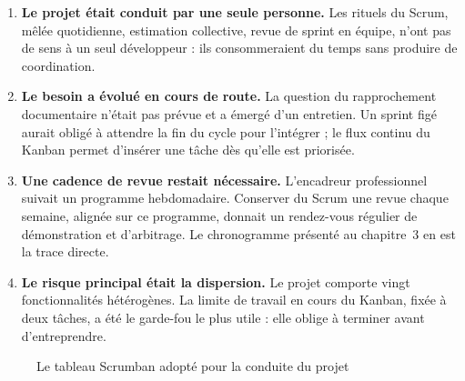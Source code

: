 \begin{enumerate}
  \item \textbf{Le projet était conduit par une seule personne.} Les rituels du
        Scrum, mêlée quotidienne, estimation collective, revue de sprint en
        équipe, n'ont pas de sens à un seul développeur : ils consommeraient du
        temps sans produire de coordination.

  \item \textbf{Le besoin a évolué en cours de route.} La question du
        rapprochement documentaire n'était pas prévue et a émergé d'un
        entretien. Un sprint figé aurait obligé à attendre la fin du cycle pour
        l'intégrer ; le flux continu du Kanban permet d'insérer une tâche dès
        qu'elle est priorisée.

  \item \textbf{Une cadence de revue restait nécessaire.} L'encadreur
        professionnel suivait un programme hebdomadaire. Conserver du Scrum une
        revue chaque semaine, alignée sur ce programme, donnait un rendez-vous
        régulier de démonstration et d'arbitrage. Le chronogramme présenté au
        chapitre~3 en est la trace directe.

  \item \textbf{Le risque principal était la dispersion.} Le projet comporte
        vingt fonctionnalités hétérogènes. La limite de travail en cours du
        Kanban, fixée à deux tâches, a été le garde-fou le plus utile : elle
        oblige à terminer avant d'entreprendre.
\end{enumerate}

\begin{figure}[htbp]
\centering
{}
\caption{Le tableau Scrumban adopté pour la conduite du projet}
\label{fig:scrumban}
\end{figure}

